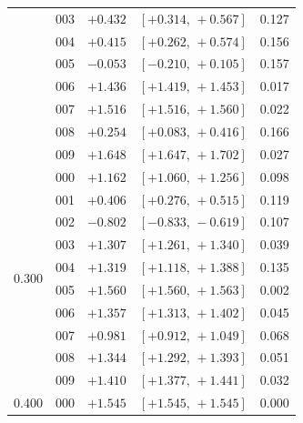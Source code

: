 \documentclass[11pt,a4paper]{article}
\begin{document}
\begin{table}[h]
\begin{tabular}{r l r@{\,}l r}
 & 003 & $+0.432$ & $[+0.314,\,+0.567]$ & 0.127 \\
 & 004 & $+0.415$ & $[+0.262,\,+0.574]$ & 0.156 \\
 & 005 & $-0.053$ & $[-0.210,\,+0.105]$ & 0.157 \\
 & \textcolor{warnred}{006} & \textcolor{warnred}{$+1.436$} & \textcolor{warnred}{$[+1.419,\,+1.453]$} & \textcolor{warnred}{0.017} \\
 & \textcolor{warnred}{007} & \textcolor{warnred}{$+1.516$} & \textcolor{warnred}{$[+1.516,\,+1.560]$} & \textcolor{warnred}{0.022} \\
 & 008 & $+0.254$ & $[+0.083,\,+0.416]$ & 0.166 \\
 & \textcolor{warnred}{009} & \textcolor{warnred}{$+1.648$} & \textcolor{warnred}{$[+1.647,\,+1.702]$} & \textcolor{warnred}{0.027} \\
\midrule
\multirow{10}{*}{0.300}
 & \textcolor{warnred}{000} & \textcolor{warnred}{$+1.162$} & \textcolor{warnred}{$[+1.060,\,+1.256]$} & \textcolor{warnred}{0.098} \\
 & 001 & $+0.406$ & $[+0.276,\,+0.515]$ & 0.119 \\
 & 002 & $-0.802$ & $[-0.833,\,-0.619]$ & 0.107 \\
 & \textcolor{warnred}{003} & \textcolor{warnred}{$+1.307$} & \textcolor{warnred}{$[+1.261,\,+1.340]$} & \textcolor{warnred}{0.039} \\
 & \textcolor{warnred}{004} & \textcolor{warnred}{$+1.319$} & \textcolor{warnred}{$[+1.118,\,+1.388]$} & \textcolor{warnred}{0.135} \\
 & \textcolor{warnred}{005} & \textcolor{warnred}{$+1.560$} & \textcolor{warnred}{$[+1.560,\,+1.563]$} & \textcolor{warnred}{0.002} \\
 & \textcolor{warnred}{006} & \textcolor{warnred}{$+1.357$} & \textcolor{warnred}{$[+1.313,\,+1.402]$} & \textcolor{warnred}{0.045} \\
 & \textcolor{warnred}{007} & \textcolor{warnred}{$+0.981$} & \textcolor{warnred}{$[+0.912,\,+1.049]$} & \textcolor{warnred}{0.068} \\
 & \textcolor{warnred}{008} & \textcolor{warnred}{$+1.344$} & \textcolor{warnred}{$[+1.292,\,+1.393]$} & \textcolor{warnred}{0.051} \\
 & \textcolor{warnred}{009} & \textcolor{warnred}{$+1.410$} & \textcolor{warnred}{$[+1.377,\,+1.441]$} & \textcolor{warnred}{0.032} \\
\midrule
\multirow{10}{*}{0.400}
 & \textcolor{warnred}{000} & \textcolor{warnred}{$+1.545$} & \textcolor{warnred}{$[+1.545,\,+1.545]$} & \textcolor{warnred}{0.000} \\

\end{tabular}
\end{table}
\end{document}
